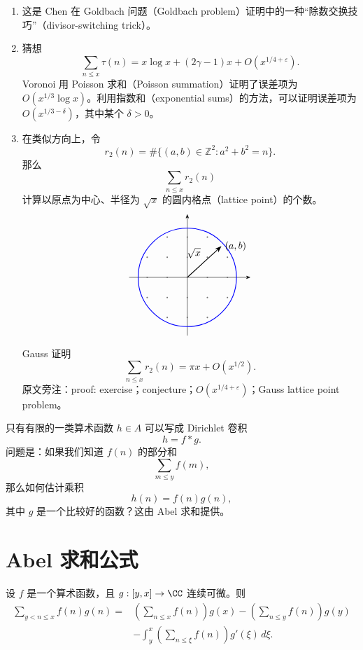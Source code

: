 \begin{remark}
	\begin{enumerate}[label=(\alph*)]
		\item 这是 Chen 在 Goldbach 问题（Goldbach problem）证明中的一种“除数交换技巧”（divisor-switching trick）。
		\item 猜想
		\[
			\sum_{n\leq x}\tau(n)
			=
			x\log x+(2\gamma-1)x+O(x^{1/4+\varepsilon}).
		\]
		Voronoi 用 Poisson 求和（Poisson summation）证明了误差项为 $O(x^{1/3}\log x)$。利用指数和（exponential sums）的方法，可以证明误差项为 $O(x^{1/3-\delta})$，其中某个 $\delta>0$。
		\item 在类似方向上，令
		\[
			r_2(n)=\#\{(a,b)\in\mathbb Z^2:a^2+b^2=n\}.
		\]
		那么
		\[
			\sum_{n\leq x}r_2(n)
		\]
		计算以原点为中心、半径为 $\sqrt{x}$ 的圆内格点（lattice point）的个数。
		\[
		\begin{tikzpicture}[scale=0.72, >=Stealth]
			\draw[->] (-2.9,0) -- (3.15,0);
			\draw[->] (0,-2.9) -- (0,3.15);
			\draw[blue, thick] (0,0) circle (2.45);
			\draw[->, thick] (0,0) -- (1.7,1.55) node[midway, above left] {$\sqrt{x}$};
			\node[right] at (1.7,1.55) {$(a,b)$};
			\foreach \i in {-2,-1,0,1,2} {
				\foreach \j in {-2,-1,0,1,2} {
					\pgfmathsetmacro{\rr}{\i*\i+\j*\j}
					\ifdim \rr pt<6.01pt
						\fill[black!55] (\i,\j) circle (1pt);
					\fi
				}
			}
		\end{tikzpicture}
		\]
		Gauss 证明
		\[
			\sum_{n\leq x}r_2(n)=\pi x+O(x^{1/2}).
		\]
		原文旁注：proof: exercise；conjecture；$O(x^{1/4+\varepsilon})$；Gauss lattice point problem。
	\end{enumerate}
\end{remark}

只有有限的一类算术函数 $h\in A$ 可以写成 Dirichlet 卷积
\[
	h=f*g.
\]
问题是：如果我们知道 $f(n)$ 的部分和
\[
	\sum_{m\leq y}f(m),
\]
那么如何估计乘积
\[
	h(n)=f(n)g(n),
\]
其中 $g$ 是一个比较好的函数？这由 Abel 求和提供。

\section{Abel 求和公式}


\begin{theorem}
	设 $f$ 是一个算术函数，且 $g:[y,x]\to\CC$ 连续可微。则
	\[
	\begin{aligned}
		\sum_{y<n\leq x}f(n)g(n)
		={}&
		\left(\sum_{n\leq x}f(n)\right)g(x)
		-
		\left(\sum_{n\leq y}f(n)\right)g(y) \\
		&-
		\int_y^x
		\left(\sum_{n\leq \xi}f(n)\right)g'(\xi)\,d\xi.
	\end{aligned}
	\]
\end{theorem}


